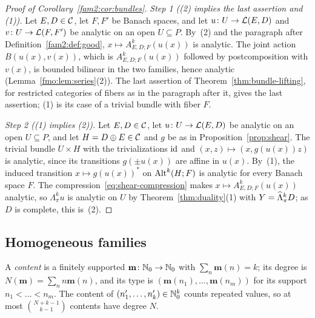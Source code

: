 \begin{proof}[Proof of Corollary~\ref{fam2:cor:bundles}]
\emph{Step 1 ((2) implies the last assertion and (1)).} Let $E,D\in\mathcal{C}$, let $F,F'$ be Banach spaces, and let
$u\colon U\to\mathcal L(E,D)$ and $v\colon U\to\mathcal L(F,F')$ be analytic on an open $U\subseteq P$. By~(2) and the paragraph after
Definition~\ref{fam2:def:good}, $x\mapsto A^k_{E,D;F}(u(x))$ is analytic. The joint action $B(u(x),v(x))$, which is
$A^k_{E,D;F}(u(x))$ followed by postcomposition with $v(x)$, is bounded bilinear in the two families, hence analytic
(Lemma~\ref{fmo:lem:series}(2)). The last assertion of Theorem~\ref{thm:bundle-lifting}, for restricted categories of
fibers as in the paragraph after it, gives the last assertion; (1) is its case of a trivial bundle with fiber $F$.

\emph{Step 2 ((1) implies (2)).} Let $E,D\in\mathcal{C}$, let $u\colon U\to\mathcal L(E,D)$ be analytic on an open $U\subseteq P$, and let
$H=D\oplus E\in\mathcal{C}$ and $g$ be as in Proposition~\ref{prop:shear}. The trivial bundle $U\times H$ with the trivializations
$\mathrm{id}$ and $(x,z)\mapsto(x,g(u(x))z)$ is analytic, since its transitions $g(\pm u(x))$ are affine in $u(x)$. By~(1), the
induced transition $x\mapsto g(u(x))^*$ on $\operatorname{Alt}^k(H;F)$ is analytic for every Banach space $F$. The
compression~\eqref{eq:shear-compression} makes $x\mapsto A^k_{E,D;F}(u(x))$ analytic, so $\Lambda^k_\pi u$ is analytic on
$U$ by Theorem~\ref{thm:duality}(1) with $Y=\widehat\Lambda^k_\pi D$; as $D$ is complete, this is~(2).
\end{proof}

\subsection{Homogeneous families}\label{fmo:ssec:reduction}

A \emph{content} is a finitely supported $\mathbf m\colon\mathbb N_0\to\mathbb N_0$ with $\sum_n\mathbf m(n)=k$; its degree is
$N(\mathbf m)=\sum_nn\mathbf m(n)$, and its type is $(\mathbf m(n_1),\dots,\mathbf m(n_m))$ for its support $n_1<\dots<n_m$.
The content of $(n'_1,\dots,n'_k)\in\mathbb N_0^k$ counts repeated values, so at most $\binom{N+k-1}{k-1}$ contents have degree $N$.

